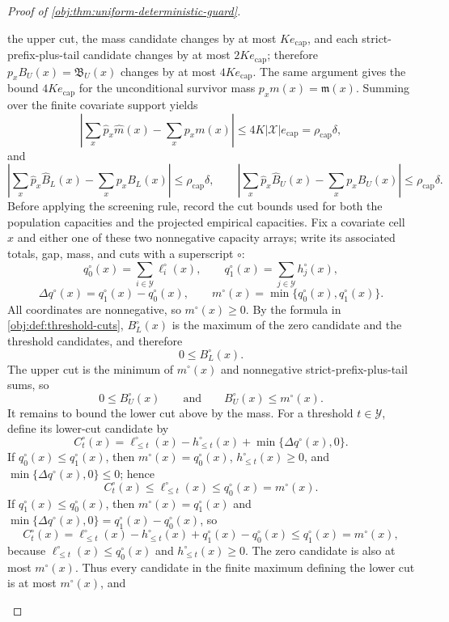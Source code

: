 \documentclass[11pt]{article}
\begin{document}
\begin{proof}[Proof of \cref{obj:thm:uniform-deterministic-guard}]
\begin{enumerate}
the upper cut, the mass candidate changes by at most \(Ke_{\mathrm{cap}}\), and
each strict-prefix-plus-tail candidate changes by at most \(2Ke_{\mathrm{cap}}\);
therefore \(p_xB_U(x)=\mathfrak B_U(x)\) changes by at most
\(4Ke_{\mathrm{cap}}\).  The same argument gives the bound
\(4Ke_{\mathrm{cap}}\) for the unconditional survivor mass
\(p_xm(x)=\mathfrak m(x)\).  Summing over the finite covariate support yields
\[
\left|
\sum_x \widehat p_x\widehat m(x)-\sum_x p_xm(x)
\right|
\le
4K|\mathcal X|e_{\mathrm{cap}}
=
\rho_{\mathrm{cap}}\delta,
\]
and
\[
\left|
\sum_x \widehat p_x\widehat B_L(x)-\sum_x p_xB_L(x)
\right|
\le
\rho_{\mathrm{cap}}\delta,
\qquad
\left|
\sum_x \widehat p_x\widehat B_U(x)-\sum_x p_xB_U(x)
\right|
\le
\rho_{\mathrm{cap}}\delta.
\]
Before applying the screening rule, record the cut bounds used for both the
population capacities and the projected empirical capacities.  Fix a covariate
cell \(x\) and either one of these two nonnegative capacity arrays; write its
associated totals, gap, mass, and cuts with a superscript \(\circ\):
\[
q_0^\circ(x)=\sum_{i\in\mathcal Y}\ell_i^\circ(x),
\qquad
q_1^\circ(x)=\sum_{j\in\mathcal Y}h_j^\circ(x),
\]
\[
\Delta q^\circ(x)=q_1^\circ(x)-q_0^\circ(x),
\qquad
m^\circ(x)=\min\{q_0^\circ(x),q_1^\circ(x)\}.
\]
All coordinates are nonnegative, so \(m^\circ(x)\ge0\).  By the formula in
\cref{obj:def:threshold-cuts}, \(B_L^\circ(x)\) is the maximum of the zero
candidate and the threshold candidates, and therefore
\[
0\le B_L^\circ(x).
\]
The upper cut is the minimum of \(m^\circ(x)\) and nonnegative
strict-prefix-plus-tail sums, so
\[
0\le B_U^\circ(x)
\qquad\text{and}\qquad
B_U^\circ(x)\le m^\circ(x).
\]
It remains to bound the lower cut above by the mass.  For a threshold
\(t\in\mathcal Y\), define its lower-cut candidate by
\[
C_t^\circ(x)
=
\ell_{\le t}^\circ(x)-h_{\le t}^\circ(x)
+\min\{\Delta q^\circ(x),0\}.
\]
If \(q_0^\circ(x)\le q_1^\circ(x)\), then
\(m^\circ(x)=q_0^\circ(x)\), \(h_{\le t}^\circ(x)\ge0\), and
\(\min\{\Delta q^\circ(x),0\}\le0\); hence
\[
C_t^\circ(x)
\le
\ell_{\le t}^\circ(x)
\le
q_0^\circ(x)
=
m^\circ(x).
\]
If \(q_1^\circ(x)\le q_0^\circ(x)\), then
\(m^\circ(x)=q_1^\circ(x)\) and
\(\min\{\Delta q^\circ(x),0\}=q_1^\circ(x)-q_0^\circ(x)\), so
\[
C_t^\circ(x)
=
\ell_{\le t}^\circ(x)-h_{\le t}^\circ(x)
+q_1^\circ(x)-q_0^\circ(x)
\le
q_1^\circ(x)
=
m^\circ(x),
\]
because \(\ell_{\le t}^\circ(x)\le q_0^\circ(x)\) and
\(h_{\le t}^\circ(x)\ge0\).  The zero candidate is also at most
\(m^\circ(x)\).  Thus every candidate in the finite maximum defining the lower
cut is at most \(m^\circ(x)\), and

\end{enumerate}
\end{proof}
\end{document}
